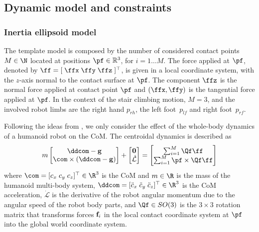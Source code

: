 \label{sec:pb_statement}

\subsection{Dynamic model and constraints}
\label{sec:dynmodel}

\subsubsection*{Inertia ellipsoid model}
The template model is composed by the number of considered contact points $M\in\N$ located at positions $\pf \in \mathbb{R}^3$, for $i=1\dots M$.
The force applied at $\pf$, denoted by $\ff = [ \; \ffx \; \ffy \; \ffz \; ]^{\top}$, is given in a local coordinate system, with the $z$-axis normal to the contact surface at $\pf$.
The component $\ffz$ is the normal force applied at contact point $\pf$ and $(\ffx, \ffy)$ is the tangential force applied at $\pf$.
In the context of the stair climbing motion, $M=3$, and the involved robot limbs are the right hand $p_{rh}$, the left foot~$p_{lf}$ and right foot~$p_{rf}$.

Following the ideas from \cite{Orin:autorob:2013,Nishiwaki:IJRR:2012}, we only consider the effect of the whole-body dynamics of a humanoid robot on the CoM. The centroidal dynamics is described as
\begin{equation}
  \label{eq:equilibrium_constraints}
  m
  \begin{bmatrix}
  \ddcom - {\bf g} \\
  \com \times (\ddcom - {\bf g})
  \end{bmatrix}
  +
  \begin{bmatrix}
  {\bf 0} \\
  \dot{\mathcal{L}}
  \end{bmatrix}
  =
  \begin{bmatrix}
  \sum_{i=1}^{M}
  \Qf \ff \\
  \sum_{i=1}^{M}
  \pf \times \Qf  \ff
\end{bmatrix}
\end{equation}
where $\com = [ c_x \; c_y \; c_z ]^{\top}\in \R^3$ is the CoM and $m\in\R$ is the mass of the humanoid multi-body system, $\ddcom = [ \ddot{c}_x \; \ddot{c}_y \; \ddot{c}_z ]^{\top}\in\R^3$ is the CoM acceleration, $\dot{\mathcal{L}}$ is the derivative of the robot angular momentum due to the angular speed of the robot body parts, and $\Qf \in SO(3)$ is the $3\times3$ rotation matrix that transforms forces ${\bf f}_i$ in the local contact coordinate system at $\pf$ into the global world coordinate system.

